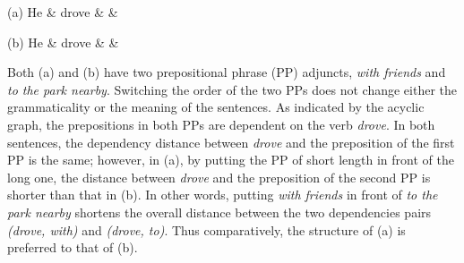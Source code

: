 \documentclass[11pt,letterpaper]{article}
\begin{document}
	{\begin{center}
			\begin{dependency}[theme = simple]
				\begin{deptext}[font=\footnotesize]
					(a) He \& drove \&  \& \\
				\end{deptext}
			\end{dependency}	
		\end{center}}
		{\begin{center}
				\begin{dependency}[theme = simple]
					\begin{deptext}[font=\footnotesize]
						(b) He \& drove  \&  \& \\
					\end{deptext}
				\end{dependency}	
			\end{center}}
Both (a) and (b) have two prepositional phrase (PP) adjuncts, \textit{with friends} and \textit{to the park nearby}. Switching the order of the two PPs does not change either the grammaticality or the meaning of the sentences. As indicated by the acyclic graph, the prepositions in both PPs are dependent on the verb \textit{drove}. In both sentences, the dependency distance between \textit{drove} and the preposition of the first PP is the same; however, in (a), by putting the PP of short length in front of the long one, the distance between \textit{drove} and the preposition of the second PP is shorter than that in (b). In other words, putting \textit{with friends} in front of \textit{to the park nearby} shortens the overall distance between the two dependencies pairs \textit{(drove, with)} and \textit{(drove, to)}. Thus comparatively, the structure of (a) is preferred to that of (b).
\end{document}
